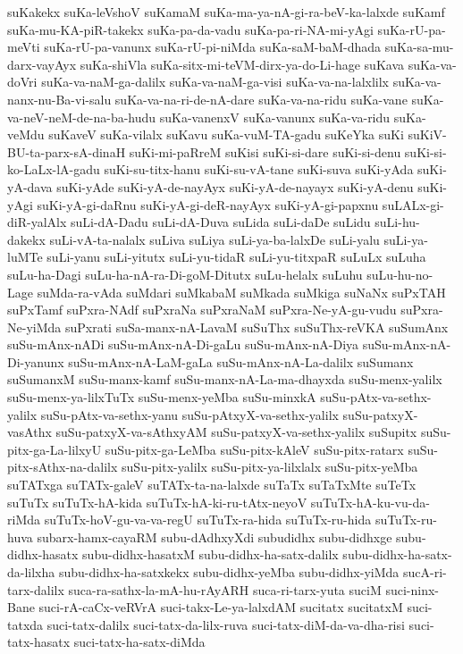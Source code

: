 {suKakekx
suKa-leVshoV
suKamaM
suKa-ma-ya-nA-gi-ra-beV-ka-lalxde
suKamf
suKa-mu-KA-piR-takekx
suKa-pa-da-vadu
suKa-pa-ri-NA-mi-yAgi
suKa-rU-pa-meVti
suKa-rU-pa-vanunx
suKa-rU-pi-niMda
suKa-saM-baM-dhada
suKa-sa-mu-darx-vayAyx
suKa-shiVla
suKa-sitx-mi-teVM-dirx-ya-do-Li-hage
suKava
suKa-va-doVri
suKa-va-naM-ga-dalilx
suKa-va-naM-ga-visi
suKa-va-na-lalxlilx
suKa-va-nanx-nu-Ba-vi-salu
suKa-va-na-ri-de-nA-dare
suKa-va-na-ridu
suKa-vane
suKa-va-neV-neM-de-na-ba-hudu
suKa-vanenxV
suKa-vanunx
suKa-va-ridu
suKa-veMdu
suKaveV
suKa-vilalx
suKavu
suKa-vuM-TA-gadu
suKeYka
suKi
suKiV-BU-ta-parx-sA-dinaH
suKi-mi-paRreM
suKisi
suKi-si-dare
suKi-si-denu
suKi-si-ko-LaLx-lA-gadu
suKi-su-titx-hanu
suKi-su-vA-tane
suKi-suva
suKi-yAda
suKi-yA-dava
suKi-yAde
suKi-yA-de-nayAyx
suKi-yA-de-nayayx
suKi-yA-denu
suKi-yAgi
suKi-yA-gi-daRnu
suKi-yA-gi-deR-nayAyx
suKi-yA-gi-papxnu
suLALx-gi-diR-yalAlx
suLi-dA-Dadu
suLi-dA-Duva
suLida
suLi-daDe
suLidu
suLi-hu-dakekx
suLi-vA-ta-nalalx
suLiva
suLiya
suLi-ya-ba-lalxDe
suLi-yalu
suLi-ya-luMTe
suLi-yanu
suLi-yitutx
suLi-yu-tidaR
suLi-yu-titxpaR
suLuLx
suLuha
suLu-ha-Dagi
suLu-ha-nA-ra-Di-goM-Ditutx
suLu-helalx
suLuhu
suLu-hu-no-Lage
suMda-ra-vAda
suMdari
suMkabaM
suMkada
suMkiga
suNaNx
suPxTAH
suPxTamf
suPxra-NAdf
suPxraNa
suPxraNaM
suPxra-Ne-yA-gu-vudu
suPxra-Ne-yiMda
suPxrati
suSa-manx-nA-LavaM
suSuThx
suSuThx-reVKA
suSumAnx
suSu-mAnx-nADi
suSu-mAnx-nA-Di-gaLu
suSu-mAnx-nA-Diya
suSu-mAnx-nA-Di-yanunx
suSu-mAnx-nA-LaM-gaLa
suSu-mAnx-nA-La-dalilx
suSumanx
suSumanxM
suSu-manx-kamf
suSu-manx-nA-La-ma-dhayxda
suSu-menx-yalilx
suSu-menx-ya-lilxTuTx
suSu-menx-yeMba
suSu-minxkA
suSu-pAtx-va-sethx-yalilx
suSu-pAtx-va-sethx-yanu
suSu-pAtxyX-va-sethx-yalilx
suSu-patxyX-vasAthx
suSu-patxyX-va-sAthxyAM
suSu-patxyX-va-sethx-yalilx
suSupitx
suSu-pitx-ga-La-lilxyU
suSu-pitx-ga-LeMba
suSu-pitx-kAleV
suSu-pitx-ratarx
suSu-pitx-sAthx-na-dalilx
suSu-pitx-yalilx
suSu-pitx-ya-lilxlalx
suSu-pitx-yeMba
suTATxga
suTATx-galeV
suTATx-ta-na-lalxde
suTaTx
suTaTxMte
suTeTx
suTuTx
suTuTx-hA-kida
suTuTx-hA-ki-ru-tAtx-neyoV
suTuTx-hA-ku-vu-da-riMda
suTuTx-hoV-gu-va-va-regU
suTuTx-ra-hida
suTuTx-ru-hida
suTuTx-ru-huva
subarx-hamx-cayaRM
subu-dAdhxyXdi
subudidhx
subu-didhxge
subu-didhx-hasatx
subu-didhx-hasatxM
subu-didhx-ha-satx-dalilx
subu-didhx-ha-satx-da-lilxha
subu-didhx-ha-satxkekx
subu-didhx-yeMba
subu-didhx-yiMda
sucA-ri-tarx-dalilx
suca-ra-sathx-la-mA-hu-rAyARH
suca-ri-tarx-yuta
suciM
suci-ninx-Bane
suci-rA-caCx-veRVrA
suci-takx-Le-ya-lalxdAM
sucitatx
sucitatxM
suci-tatxda
suci-tatx-dalilx
suci-tatx-da-lilx-ruva
suci-tatx-diM-da-va-dha-risi
suci-tatx-hasatx
suci-tatx-ha-satx-diMda
}
